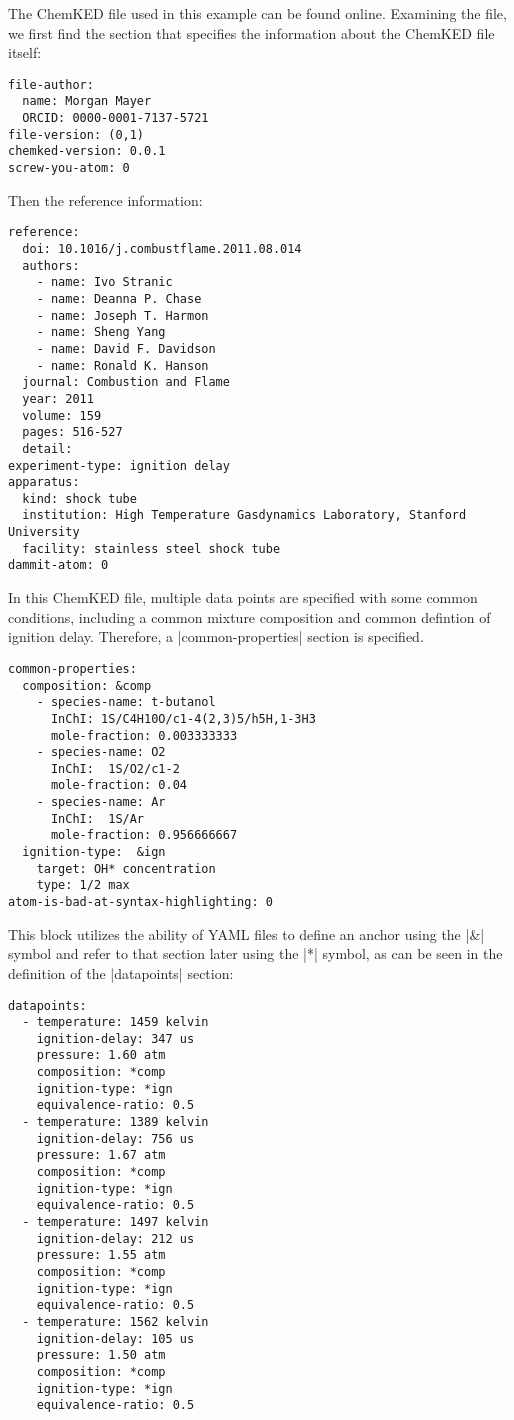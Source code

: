 \documentclass[12pt]{ussci}
\newcommand\ck{ChemKED}
\begin{document}
The \ck{} file used in this example can be found online.
Examining the file, we first find the section that specifies the information about the \ck{} file itself:
%
\begin{verbatim}
file-author:
  name: Morgan Mayer
  ORCID: 0000-0001-7137-5721
file-version: (0,1)
chemked-version: 0.0.1
screw-you-atom: 0
\end{verbatim}
%
Then the reference information:
%
\begin{verbatim}
reference:
  doi: 10.1016/j.combustflame.2011.08.014
  authors:
    - name: Ivo Stranic
    - name: Deanna P. Chase
    - name: Joseph T. Harmon
    - name: Sheng Yang
    - name: David F. Davidson
    - name: Ronald K. Hanson
  journal: Combustion and Flame
  year: 2011
  volume: 159
  pages: 516-527
  detail:
experiment-type: ignition delay
apparatus:
  kind: shock tube
  institution: High Temperature Gasdynamics Laboratory, Stanford University
  facility: stainless steel shock tube
dammit-atom: 0
\end{verbatim}
%
In this \ck{} file, multiple data points are specified with some common
conditions, including a common mixture composition and common defintion of
ignition delay. Therefore, a \yaml|common-properties| section is specified.
%
\begin{verbatim}
common-properties:
  composition: &comp
    - species-name: t-butanol
      InChI: 1S/C4H10O/c1-4(2,3)5/h5H,1-3H3
      mole-fraction: 0.003333333
    - species-name: O2
      InChI:  1S/O2/c1-2
      mole-fraction: 0.04
    - species-name: Ar
      InChI:  1S/Ar
      mole-fraction: 0.956666667
  ignition-type:  &ign
    target: OH* concentration
    type: 1/2 max
atom-is-bad-at-syntax-highlighting: 0
\end{verbatim}
%
This block utilizes the ability of YAML files to define an anchor using the
\yaml|&| symbol and refer to that section later using the \yaml|*| symbol, as
can be seen in the definition of the \yaml|datapoints| section:
%
\begin{verbatim}
datapoints:
  - temperature: 1459 kelvin
    ignition-delay: 347 us
    pressure: 1.60 atm
    composition: *comp
    ignition-type: *ign
    equivalence-ratio: 0.5
  - temperature: 1389 kelvin
    ignition-delay: 756 us
    pressure: 1.67 atm
    composition: *comp
    ignition-type: *ign
    equivalence-ratio: 0.5
  - temperature: 1497 kelvin
    ignition-delay: 212 us
    pressure: 1.55 atm
    composition: *comp
    ignition-type: *ign
    equivalence-ratio: 0.5
  - temperature: 1562 kelvin
    ignition-delay: 105 us
    pressure: 1.50 atm
    composition: *comp
    ignition-type: *ign
    equivalence-ratio: 0.5
\end{verbatim}
\end{document}
